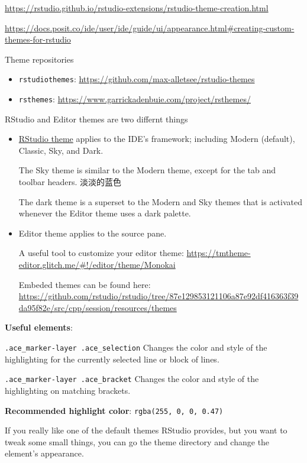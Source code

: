 \documentclass[
]{book}
\providecommand{\tightlist}{%
  \setlength{\itemsep}{0pt}\setlength{\parskip}{0pt}}
\theoremstyle{definition}
\theoremstyle{definition}
\theoremstyle{definition}
\theoremstyle{definition}
\theoremstyle{remark}
\begin{document}
\url{https://rstudio.github.io/rstudio-extensions/rstudio-theme-creation.html}

\url{https://docs.posit.co/ide/user/ide/guide/ui/appearance.html\#creating-custom-themes-for-rstudio}

Theme repositories

\begin{itemize}
\tightlist
\item
  \texttt{rstudiothemes}: \url{https://github.com/max-alletsee/rstudio-themes}
\item
  \texttt{rsthemes}: \url{https://www.garrickadenbuie.com/project/rsthemes/}
\end{itemize}

RStudio and Editor themes are two differnt things

\begin{itemize}
\item
  \href{https://support.posit.co/hc/en-us/articles/115011846747-Using-Themes-in-the-RStudio-IDE}{RStudio theme} applies to the IDE's framework; including Modern (default), Classic, Sky, and Dark.

  The Sky theme is similar to the Modern theme, except for the tab and toolbar headers. 淡淡的蓝色

  The dark theme is a superset to the Modern and Sky themes that is activated whenever the Editor theme uses a dark palette.
\item
  Editor theme applies to the source pane.

  A useful tool to customize your editor theme: \url{https://tmtheme-editor.glitch.me/\#!/editor/theme/Monokai}

  Embeded themes can be found here: \url{https://github.com/rstudio/rstudio/tree/87e129853121106a87e92df416363f39da95f82e/src/cpp/session/resources/themes}
\end{itemize}

\textbf{Useful elements}:

\texttt{.ace\_marker-layer\ .ace\_selection} Changes the color and style of the highlighting for the currently selected line or block of lines.

\texttt{.ace\_marker-layer\ .ace\_bracket} Changes the color and style of the highlighting on matching brackets.

\textbf{Recommended highlight color}: \texttt{rgba(255,\ 0,\ 0,\ 0.47)}

If you really like one of the default themes RStudio provides, but you want to tweak some small things, you can go the theme directory and change the element's appearance.
\end{document}

